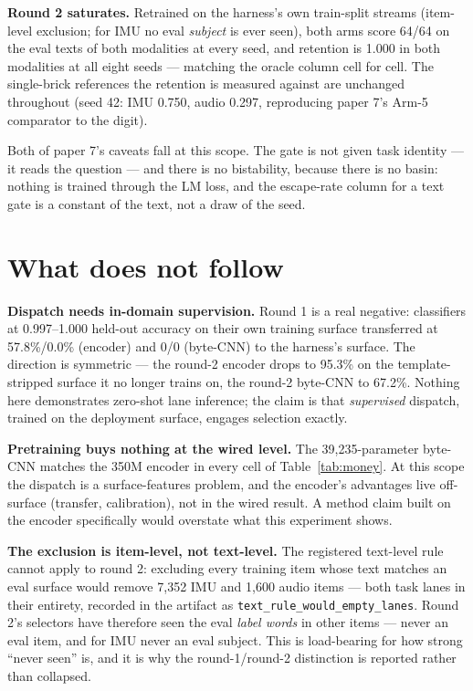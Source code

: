 \documentclass[11pt]{article}
\begin{document}
\textbf{Round 2 saturates.} Retrained on the harness's own train-split
streams (item-level exclusion; for IMU no eval \emph{subject} is ever
seen), both arms score 64/64 on the eval texts of both modalities at every
seed, and retention is 1.000 in both modalities at all eight seeds ---
matching the oracle column cell for cell. The single-brick references the
retention is measured against are unchanged throughout (seed 42: IMU
0.750, audio 0.297, reproducing paper 7's Arm-5
comparator to the digit).

Both of paper 7's caveats fall at this scope. The gate is not given task
identity --- it reads the question --- and there is no bistability, because
there is no basin: nothing is trained through the LM loss, and the
escape-rate column for a text gate is a constant of the text, not a draw of
the seed.

\section{What does not follow}

\textbf{Dispatch needs in-domain supervision.} Round 1 is a real negative:
classifiers at 0.997--1.000 held-out accuracy on their own training surface
transferred at 57.8\%/0.0\% (encoder) and 0/0
(byte-CNN) to the harness's surface. The direction is symmetric --- the
round-2 encoder drops to 95.3\% on the template-stripped surface
it no longer trains on, the round-2 byte-CNN to 67.2\%. Nothing
here demonstrates zero-shot lane inference; the claim is that
\emph{supervised} dispatch, trained on the deployment surface, engages
selection exactly.

\textbf{Pretraining buys nothing at the wired level.} The
39,235-parameter byte-CNN matches the 350M encoder in every cell of
Table~\ref{tab:money}. At this scope the dispatch is a surface-features
problem, and the encoder's advantages live off-surface (transfer,
calibration), not in the wired result. A method claim built on the encoder
specifically would overstate what this experiment shows.

\textbf{The exclusion is item-level, not text-level.} The registered
text-level rule cannot apply to round 2: excluding every training item whose
text matches an eval surface would remove
7,352 IMU and
1,600 audio items --- both
task lanes in their entirety, recorded in the artifact as
\texttt{text\_rule\_would\_empty\_lanes}. Round 2's selectors have
therefore seen the eval \emph{label words} in other items --- never an
eval item, and for IMU never an eval subject. This is load-bearing for how
strong ``never seen'' is, and it is why the round-1/round-2 distinction is
reported rather than collapsed.
\end{document}
